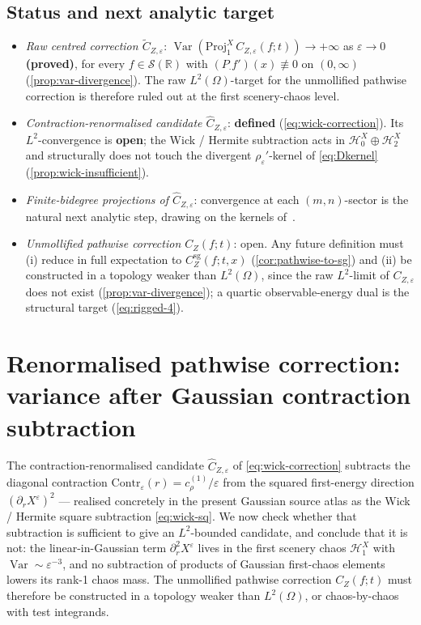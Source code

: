 \documentclass[11pt,reqno]{amsart}
\theoremstyle{plain}
\theoremstyle{definition}
\theoremstyle{remark}
\newcommand{\R}{\mathbb{R}}
\newcommand{\Hilb}{\mathcal{H}}
\newcommand{\IBM}{Z}
\DeclareMathOperator{\Var}{Var}
\begin{document}
\subsection*{Status and next analytic target}

\begin{itemize}
\item \emph{Raw centred correction $\tilde C_{\IBM,\varepsilon}$}:
  $\Var(\mathrm{Proj}_1^{X}\,C_{\IBM,\varepsilon}(f;t))\to+\infty$ as
  $\varepsilon\to 0$ \textbf{(proved)}, for every $f\in\mathscr S(\R)$
  with $(P_\cdot f')(x)\not\equiv 0$ on $(0,\infty)$
  (\cref{prop:var-divergence}). The raw $L^{2}(\Omega)$-target for
  the unmollified pathwise correction is therefore ruled out at the
  first scenery-chaos level.
\item \emph{Contraction-renormalised candidate
  $\widehat C_{\IBM,\varepsilon}$}: \textbf{defined}
  (\eqref{eq:wick-correction}). Its $L^{2}$-convergence is
  \textbf{open}; the Wick / Hermite subtraction acts in
  $\Hilb_0^{X}\oplus\Hilb_2^{X}$ and structurally does not touch the
  divergent $\rho_\varepsilon'$-kernel of \eqref{eq:Dkernel}
  (\cref{prop:wick-insufficient}).
\item \emph{Finite-bidegree projections of
  $\widehat C_{\IBM,\varepsilon}$}: convergence at each
  $(m,n)$-sector is the natural next analytic step, drawing on the
  kernels of~\cite{Fontes-IBMchaos}.
\item \emph{Unmollified pathwise correction $C_\IBM(f;t)$}: open. Any
  future definition must (i) reduce in full expectation to
  $C_\IBM^{\mathrm{sg}}(f;t,x)$ (\cref{cor:pathwise-to-sg}) and
  (ii) be constructed in a topology weaker than $L^{2}(\Omega)$,
  since the raw $L^{2}$-limit of $C_{\IBM,\varepsilon}$ does not
  exist (\cref{prop:var-divergence}); a quartic observable-energy
  dual is the structural target (\eqref{eq:rigged-4}).
\end{itemize}

\section{Renormalised pathwise correction: variance after Gaussian contraction subtraction}\label{sec:renorm-correction}

The contraction-renormalised candidate $\widehat C_{\IBM,\varepsilon}$
of \eqref{eq:wick-correction} subtracts the diagonal contraction
$\mathrm{Contr}_\varepsilon(r)=c_\rho^{(1)}/\varepsilon$ from the
squared first-energy direction $(\partial_rX^\varepsilon)^{2}$ ---
realised concretely in the present Gaussian source atlas as the
Wick / Hermite square subtraction \eqref{eq:wick-sq}. We now check
whether that subtraction is sufficient to give an $L^{2}$-bounded
candidate, and conclude that it is not: the linear-in-Gaussian term
$\partial_r^{2}X^\varepsilon$ lives in the first scenery chaos
$\Hilb_1^{X}$ with $\Var\sim\varepsilon^{-3}$, and no subtraction of
products of Gaussian first-chaos elements lowers its rank-1 chaos
mass. The unmollified pathwise correction $C_\IBM(f;t)$ must therefore
be constructed in a topology weaker than $L^{2}(\Omega)$, or
chaos-by-chaos with test integrands.
\end{document}
